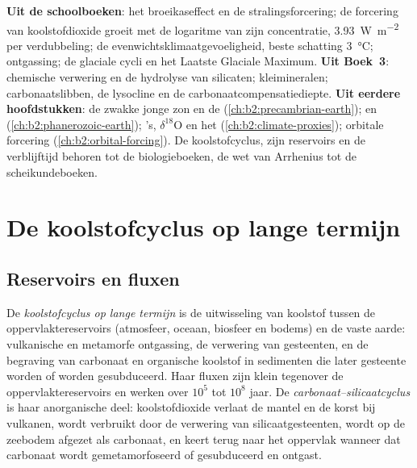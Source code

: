 \begin{recall}
\textbf{Uit de schoolboeken}: het broeikaseffect en de stralingsforcering; de forcering van
koolstofdioxide groeit met de logaritme van zijn concentratie, \qty{3.93}{W.m^{-2}} per verdubbeling;
de evenwichtsklimaatgevoeligheid, beste schatting \qty{3}{\celsius}; ontgassing; de glaciale cycli
en het Laatste Glaciale Maximum. \textbf{Uit Boek~3}: chemische verwering en de
hydrolyse van silicaten; kleimineralen; carbonaatslibben, de lysocline en de
carbonaatcompensatiediepte. \textbf{Uit eerdere hoofdstukken}: de zwakke jonge zon en de 
(\cref{ch:b2:precambrian-earth});  en 
(\cref{ch:b2:phanerozoic-earth}); 's, $\delta^{18}$O en het 
(\cref{ch:b2:climate-proxies}); orbitale forcering (\cref{ch:b2:orbital-forcing}). De koolstofcyclus,
zijn reservoirs en de verblijftijd behoren tot de biologieboeken, de wet van Arrhenius tot de
scheikundeboeken.
\end{recall}

\section{De koolstofcyclus op lange termijn}\label{sec:b2:deep-time-climate:cycle}

\subsection*{Reservoirs en fluxen}

\begin{definition}\label{def:b2:deep-time-climate:carbon-cycle}
De \emph{koolstofcyclus op lange termijn} is de uitwisseling van koolstof tussen
de oppervlaktereservoirs (atmosfeer, oceaan, biosfeer en bodems) en de vaste aarde: vulkanische en
metamorfe ontgassing, de verwering van gesteenten, en de begraving van carbonaat en organische koolstof in
sedimenten die later gesteente worden of worden gesubduceerd. Haar fluxen zijn klein tegenover de
oppervlaktereservoirs en werken over $10^5$ tot $10^8$ jaar. De
\emph{carbonaat--silicaatcyclus} is haar anorganische deel: koolstofdioxide verlaat de mantel
en de korst bij vulkanen, wordt verbruikt door de verwering van silicaatgesteenten, wordt op de
zeebodem afgezet als carbonaat, en keert terug naar het oppervlak wanneer dat carbonaat wordt gemetamorfoseerd of
gesubduceerd en ontgast.
\end{definition}

